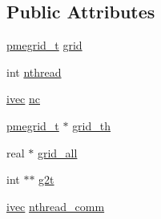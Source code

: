 \subsection*{\-Public \-Attributes}
\begin{DoxyCompactItemize}
\item 
\hyperlink{structpmegrid__t}{pmegrid\-\_\-t} \hyperlink{structpmegrids__t_ae512f10c3ea4a3dd76b573f6299e1703}{grid}
\item 
int \hyperlink{structpmegrids__t_a128cb4bc98b58e690cdf26e3d920a8ad}{nthread}
\item 
\hyperlink{share_2template_2gromacs_2types_2simple_8h_a74f6ffdb4a9c1764f5293969d8c681b6}{ivec} \hyperlink{structpmegrids__t_a3b0b3933a569b652104c973f24a1e979}{nc}
\item 
\hyperlink{structpmegrid__t}{pmegrid\-\_\-t} $\ast$ \hyperlink{structpmegrids__t_a1d7f8bb7c2805ef018ccdf3c211137ed}{grid\-\_\-th}
\item 
real $\ast$ \hyperlink{structpmegrids__t_a7f16053002ed6d7fe5fb65415520efd7}{grid\-\_\-all}
\item 
int $\ast$$\ast$ \hyperlink{structpmegrids__t_a7df80da9ed0a70730f8aab0041d455e8}{g2t}
\item 
\hyperlink{share_2template_2gromacs_2types_2simple_8h_a74f6ffdb4a9c1764f5293969d8c681b6}{ivec} \hyperlink{structpmegrids__t_a89e6151b276245126d3a4fdea855df54}{nthread\-\_\-comm}
\end{DoxyCompactItemize}


